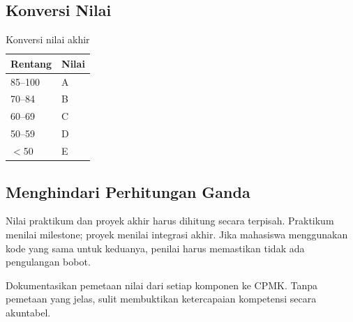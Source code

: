 \subsection{Konversi Nilai}

\begin{table}[H]
\centering
\caption{Konversi nilai akhir}
\label{tab:ch17-nilai}
\begin{tabular}{@{}ll@{}}
\toprule
\textbf{Rentang} & \textbf{Nilai} \\
\midrule
85--100 & A \\
70--84 & B \\
60--69 & C \\
50--59 & D \\
$<$50 & E \\
\bottomrule
\end{tabular}
\end{table}

\subsection{Menghindari Perhitungan Ganda}

Nilai praktikum dan proyek akhir harus dihitung secara terpisah.
Praktikum menilai milestone; proyek menilai integrasi akhir. Jika
mahasiswa menggunakan kode yang sama untuk keduanya, penilai harus
memastikan tidak ada pengulangan bobot.

\begin{warningbox}
Dokumentasikan pemetaan nilai dari setiap komponen ke CPMK. Tanpa
pemetaan yang jelas, sulit membuktikan ketercapaian kompetensi secara
akuntabel.
\end{warningbox}
